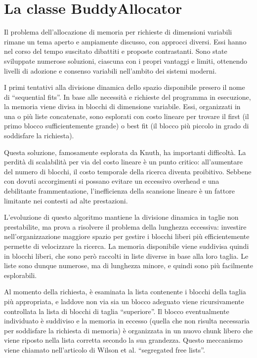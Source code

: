 \section{La classe BuddyAllocator}
Il problema dell’allocazione di memoria per richieste di dimensioni variabili rimane un tema aperto e ampiamente discusso, con approcci diversi. Essi hanno nel corso del tempo suscitato dibattiti e proposte contrastanti. Sono state sviluppate numerose soluzioni, ciascuna con i propri vantaggi e limiti, ottenendo livelli di adozione e consenso variabili nell'ambito dei sistemi moderni.

I primi tentativi alla divisione dinamica dello spazio disponibile presero il nome di “sequential fits”. In base alle necessità e richieste del programma in esecuzione, la memoria viene divisa in blocchi di dimensione variabile. Essi, organizzati in una o più liste concatenate, sono esplorati con costo lineare per trovare il first (il primo blocco sufficientemente grande) o best fit (il blocco più piccolo in grado di soddisfare la richiesta).

Questa soluzione, famosamente esplorata da Knuth, ha importanti difficoltà. La perdità di scalabilità per via del costo lineare è un punto critico: all’aumentare del numero di blocchi, il costo temporale della ricerca diventa proibitivo. Sebbene con dovuti accorgimenti si possano evitare un eccessivo overhead e una debilitante frammentazione, l’inefficienza della scansione lineare è un fattore limitante nei contesti ad alte prestazioni.

L’evoluzione di questo algoritmo mantiene la divisione dinamica in taglie non prestabilite, ma prova a risolvere il problema della lunghezza eccessiva: investire nell’organizzazione maggiore spazio per gestire i blocchi liberi più efficientemente permette di velocizzare la ricerca. La memoria disponibile viene suddivisa quindi in blocchi liberi, che sono però raccolti in liste diverse in base alla loro taglia. Le liste sono dunque numerose, ma di lunghezza minore, e quindi sono più facilmente esplorabili.

Al momento della richiesta, è esaminata la lista contenente i blocchi della taglia più appropriata, e laddove non via sia un blocco adeguato viene ricursivamente controllata la lista di blocchi di taglia “superiore”. Il blocco eventualmente individuato è suddiviso e la memoria in eccesso (quella che non risulta necessaria per soddisfare la richiesta di memoria) è organizzata in un nuovo chunk libero che viene riposto nella lista corretta secondo la sua grandezza. Questo meccanismo viene chiamato nell’articolo di Wilson et al. “segregated free lists”.

